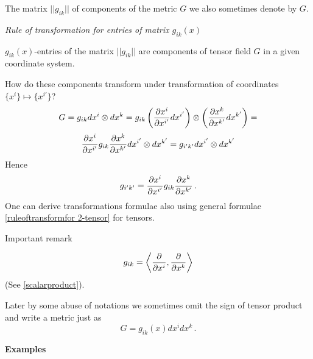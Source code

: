 \documentclass[12pt]{article}
\theoremstyle{theorem}
\numberwithin{equation}{section}
\begin{document}
  \m

 The matrix $||g_{ik}||$ of components of the metric $G$ we also sometimes denote by $G$.

    {\it Rule of transformation for entries of matrix $g_{ik}(x)$}

  $g_{ik}(x)$-entries of the matrix $||g_{ik}||$  are components of tensor field $G$ in a given coordinate system.

    How do these components transform under transformation of coordinates $\{x^{i}\}\mapsto \{x^{i'}\}$?
    \begin{equation*}
        G=g_{ik}dx^i\otimes dx^k=g_{ik}
        \left({\partial x^i\over \partial x^{i'}}dx^{i'}\right)
        \otimes
        \left({\partial x^k\over \partial x^{k'}}dx^{k'}\right)=
    \end{equation*}
    \begin{equation*}\label{ruleoftransformation}
         {\partial x^i\over \partial x^{i'}}g_{ik}{\partial x^k\over \partial x^{k'}}
        dx^{i'}
        \otimes dx^{k'}=
        g_{i'k'}
        dx^{i'}
        \otimes dx^{k'}
            \end{equation*}
    Hence
    \begin{equation}\label{transformationlaw}
     g_{i'k'}={\partial x^i\over \partial x^{i'}}g_{ik}{\partial x^k\over \partial x^{k'}}\,.
       \end{equation}
     One can derive transformations formulae also
     using general formulae \eqref{ruleoftransformfor 2-tensor} for tensors.



Important remark

     \begin{equation}\label{imporatantremark2}
 g_{ik}=\left\langle{{\partial\over \partial x^i},{\partial\over \partial x^k}}\right\rangle
     \end{equation}
(See \eqref{scalarproduct}).

Later by some abuse of notations we sometimes omit the sign of tensor product
and write a metric just as
\begin{equation*}\label{symb1}
    G=g_{ik}(x)dx^idx^k\,.
\end{equation*}


{\bf Examples}
\end{document}

